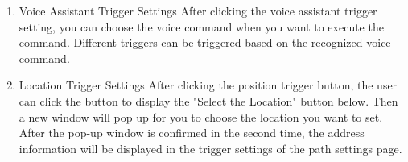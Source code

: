 \begin{enumerate}[label=\arabic*.]
\begin{enumerate}[label*={\arabic*.},ref=\theenumi.\arabic*]
                    \newpage
                    \begin{enumerate}[label*={\arabic*.},ref=\theenumi.\arabic*]
                        \newpage
                        \item  Voice Assistant Trigger Settings
                              After clicking the voice assistant trigger setting, you can choose the voice command when you want to execute the command. Different triggers can be triggered based on the recognized voice command.\\
                              \newpage
                        \clearpage
                        \item Location Trigger Settings
                              After clicking the position trigger button, the user can click the button to display the "Select the Location" button below. Then a new window will pop up for you to choose the location you want to set.\\
                              After the pop-up window is confirmed in the second time, the address information will be displayed in the trigger settings of the path settings page.\\
                              \newpage
                              \newpage

\end{enumerate}
\end{enumerate}
\end{enumerate}
